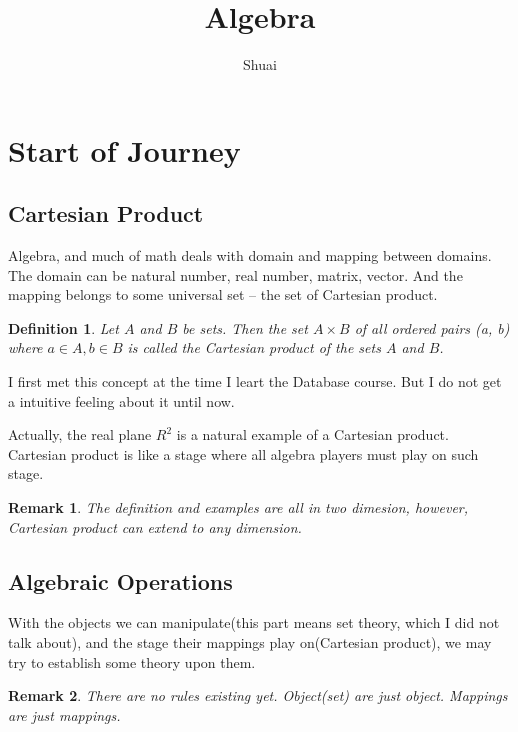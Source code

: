 \documentclass[a4paper]{article}
\title{Algebra}
\author{Shuai}
\newtheorem{definition}{Definition}[section]
\newtheorem{remark}{Remark}[section]
\begin{document}
\maketitle
\tableofcontents
\pagebreak

\section{Start of Journey}

	\subsection{Cartesian Product}

	Algebra, and much of math deals with domain and mapping between domains.
	The domain can be natural number, real number, matrix, vector. And the
	mapping belongs to some universal set -- the set of Cartesian product.

	\begin{definition}
		Let $A$ and $B$ be sets. Then the set $A \times B$ of all ordered
		pairs (a, b) where $a \in A, b \in B$ is called the Cartesian product
		of the sets $A$ and $B$.
	\end{definition}

	I first met this concept at the time I leart the Database course. But I
	do not get a intuitive feeling about it until now.

	Actually, the real plane $R^2$ is a natural example of a Cartesian
	product. Cartesian product is like a stage where all algebra players
	must play on such stage.

	\begin{remark}
		The definition and examples are all in two dimesion, however,
		Cartesian product can extend to any dimension.
	\end{remark}

	\subsection{Algebraic Operations}

	With the objects we can manipulate(this part means set theory, which I
	did not talk about), and the stage their mappings play on(Cartesian
	product), we may try to establish some theory upon them.

	\begin{remark}
		There are no rules existing yet. Object(set) are just object. Mappings
		are just mappings.
	\end{remark}
\end{document}
